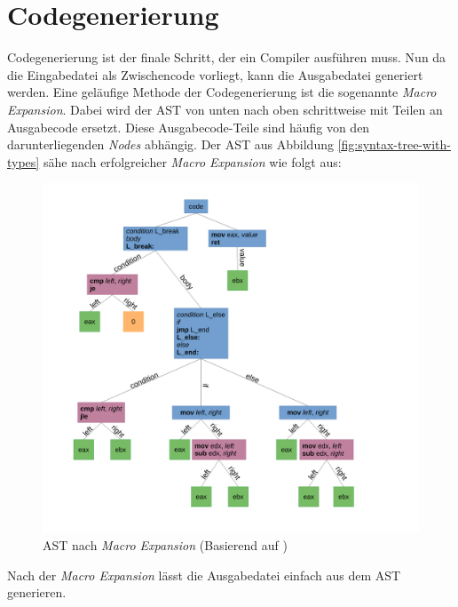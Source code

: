 \section{Codegenerierung} \label{sec:traditional_code_generation}
Codegenerierung ist der finale Schritt, der ein Compiler ausführen muss.
Nun da die Eingabedatei als Zwischencode vorliegt, kann die Ausgabedatei generiert werden. Eine geläufige Methode der Codegenerierung ist die sogenannte \textit{Macro Expansion}.
Dabei wird der AST von unten nach oben schrittweise mit Teilen an Ausgabecode ersetzt.
Diese Ausgabecode-Teile sind häufig von den darunterliegenden \textit{Nodes} abhängig. Der AST aus Abbildung \ref{fig:syntax-tree-with-types} sähe nach erfolgreicher \textit{Macro Expansion} wie folgt aus:

\begin{figure}[H]
    \centering
    \includegraphics[scale=0.4]{resources/images/AST_macro_expansion.pdf}
    \caption{AST nach \textit{Macro Expansion} (Basierend auf \cite{img:AST})}
    \label{fig:syntax-tree-after-macro-expansion}
\end{figure}

Nach der \textit{Macro Expansion} lässt die Ausgabedatei einfach aus dem AST generieren.


